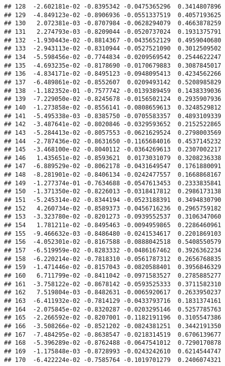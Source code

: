 \documentclass[
]{article}
\begin{document}
\begin{verbatim}
## 128  -2.602181e-02 -0.8395342 -0.0475365296  0.3414807896
## 129  -4.849123e-02 -0.8906936 -0.0551337519  0.4057193625
## 130   2.072381e-03 -0.8707984 -0.0628294079  0.4663878259
## 131   2.274793e-03 -0.8209044 -0.0520737024  0.1931375791
## 132  -1.930443e-02 -0.8814367 -0.0435652129  0.4959040680
## 133  -2.943113e-02 -0.8310944 -0.0527521090  0.3012509502
## 134  -5.598456e-02 -0.7744834 -0.0209569542  0.2544622247
## 135  -4.693235e-02 -0.8178690 -0.0170679883  0.3087845017
## 136  -4.834171e-02 -0.8495123 -0.0948095413  0.4234562266
## 137  -6.489861e-02 -0.8552607  0.0209493142  0.5208985829
## 138  -1.182352e-01 -0.7577742 -0.0139389459  0.1438339036
## 139  -7.229050e-02 -0.8245678 -0.0156502124  0.2935907936
## 140  -1.273858e-02 -0.8556141 -0.0808659613  0.3248529812
## 141  -5.495338e-03 -0.8385750 -0.0705583357  0.4893109339
## 142  -3.487641e-02 -0.8020846 -0.0329593652  0.2152522865
## 143  -5.284413e-02 -0.8057553 -0.0621629524  0.2798003569
## 144  -2.787436e-02 -0.8631650 -0.1165684016  0.4537145232
## 145  -3.468100e-02 -0.8040112 -0.0364269613  0.2307002217
## 146   1.435651e-02 -0.8593621  0.0173031079  0.3208236338
## 147  -6.889529e-02 -0.8062178 -0.0431649547  0.1761880091
## 148  -8.281901e-02 -0.8406134 -0.0242477557  0.1668868167
## 149  -1.277374e-01 -0.7634688 -0.0547613453  0.2333835841
## 150  -1.371350e-02 -0.8226013 -0.0318417812  0.2986173138
## 151  -5.245314e-02 -0.8344194 -0.0523188391  0.3494830790
## 152   4.260734e-02 -0.8589373 -0.0456716236  0.2965759182
## 153  -3.323780e-02 -0.8201273 -0.0939552537  0.3106347060
## 154   1.781211e-02 -0.8495463 -0.0094959865  0.2286460961
## 155  -9.466632e-03 -0.8486480 -0.0241534617  0.2201869103
## 156  -4.052301e-02 -0.8167588 -0.0888042518  0.5408550579
## 157  -6.519959e-02 -0.8283332 -0.0486167462  0.3926362234
## 158  -6.220214e-02 -0.7818310 -0.0561787312  0.2656768835
## 159  -1.471446e-02 -0.8157043 -0.0820588401  0.3956846329
## 160   6.711799e-02 -0.8411042 -0.0971583527  0.2785885277
## 161  -3.758122e-02 -0.8678142 -0.0593525333  0.3711582310
## 162   7.519804e-03 -0.8482631 -0.0065920617  0.2633950237
## 163  -6.411932e-02 -0.7814129 -0.0433793716  0.1831374161
## 164  -2.075845e-02 -0.8320287 -0.0203295146  0.5257785763
## 165  -2.266592e-02 -0.8207001 -0.1182191196  0.3105547386
## 166  -3.508266e-02 -0.8521202 -0.0824381251  0.3442191350
## 167  -7.484295e-02 -0.8638547 -0.0218314519  0.6706139677
## 168  -5.396289e-02 -0.8762488 -0.0647541012  0.7290170878
## 169  -1.175848e-03 -0.8728993 -0.0243242610  0.6214544747
## 170  -6.422224e-02 -0.7585764 -0.1019701279  0.2406074321

\end{verbatim}
\end{document}
